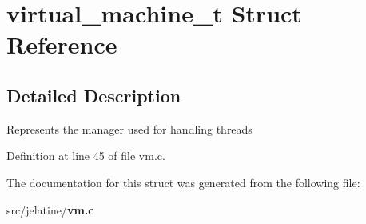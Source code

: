 \section{virtual\_\-machine\_\-t Struct Reference}
\label{structvirtual__machine__t}


\subsection{Detailed Description}
Represents the manager used for handling threads 

Definition at line 45 of file vm.c.



The documentation for this struct was generated from the following file:\begin{DoxyCompactItemize}
\item 
src/jelatine/{\bf vm.c}\end{DoxyCompactItemize}

